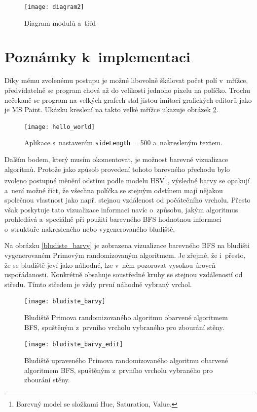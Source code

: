 \documentclass[12pt]{report}			%
\begin{document}
			\begin{figure}[H]
  			\texttt{[image: diagram2]}\caption{Diagram modulů a~tříd}\label{app_diagram}\end{figure}
  			\newpage
  			
		\section{Poznámky k~implementaci}
		Díky mému zvolenému postupu je možné libovolně škálovat počet polí v~mřížce, předvídatelně se program chová až do velikosti jednoho pixelu na políčko. Trochu nečekaně se program na velkých grafech stal jistou imitací grafických editorů jako je MS Paint. Ukázku kreslení na takto velké mřížce ukazuje obrázek \ref{hello}.
		\begin{figure}[h]
		  			\texttt{[image: hello\_world]}\caption{Aplikace s~nastavením \texttt{sideLength} = 500 a~nakresleným textem.}\label{hello}\end{figure}
		
		Dalším bodem, který musím okomentovat, je možnost barevné vizualizace algoritmů. Protože jako způsob provedení tohoto barevného přechodu bylo zvoleno postupné měnění odstínu podle modelu HSV\footnote{Barevný model se složkami Hue, Saturation, Value.}, výsledné barvy se opakují a~není možné říct, že všechna políčka se stejným odstínem mají nějakou společnou vlastnost jako např. stejnou vzdálenost od počátečního vrcholu. Přesto však poskytuje tato vizualizace informaci navíc o~způsobu, jakým algoritmus prohledává a~speciálně při použití barevného BFS hodnotnou informaci o~struktuře nakresleného nebo vygenerovaného bludiště. 
		
		Na obrázku \ref{bludiste_barvy} je zobrazena vizualizace barevného BFS na bludišti vygenerovaném Primovým randomizovaným algoritmem. Je zřejmé, že i~přesto, že se bludiště jeví jako náhodné, lze v~něm pozorovat vysokou úroveň uspořádanosti. Konkrétně obsahuje soustředné kruhy se stejnou vzdáleností od středu. Tímto středem je vždy první náhodně vybraný vrchol. %
		
\begin{figure}[h]
\begin{minipage}[outer sep=0]{\textwidth}
\begin{minipage}[t]{0.48\textwidth}
			
  			\texttt{[image: bludiste\_barvy]}\caption{Bludiště Primova randomizovaného algoritmu obarvené algoritmem BFS, spuštěným z~prvního vrcholu vybraného pro zbourání stěny.}\label{bludiste_barvy}
  			
    \end{minipage}\hfill
    \begin{minipage}[t]{0.48\textwidth}
\texttt{[image: bludiste\_barvy\_edit]}\caption{Bludiště upraveného Primova randomizovaného algoritmu obarvené algoritmem BFS, spuštěným z~prvního vrcholu vybraného pro zbourání stěny.}\label{bludiste_barvy_edit}
    \end{minipage}
    \end{minipage}\vspace{1ex}
\end{figure}
  			
\end{document}
